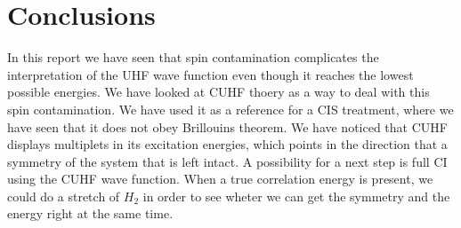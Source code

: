 \documentclass[twoside,twocolumn,9pt]{article}
\renewcommand{\refname}{Notes and references}
\begin{document}
\section{Conclusions}
In this report we have seen that spin contamination complicates the interpretation of the UHF wave function even though it reaches the lowest possible energies. We have looked at 
CUHF thoery as a way to deal with this spin contamination. We have used it as a reference for a CIS treatment, where we have seen that it does not obey Brillouins theorem.
We have noticed that CUHF displays multiplets in its excitation energies, which points in the direction that a symmetry of the system that is left intact. A possibility for a 
next step is full CI using the CUHF wave function. When a true correlation energy is present, we could do a stretch of $H_2$ in order to see wheter we can get the symmetry and 
the energy right at the same time.





\balance


\end{document}
